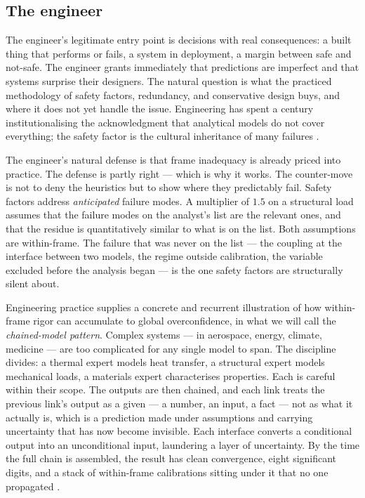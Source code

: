 \documentclass[11pt,a4paper]{article}
\begin{document}
\subsection{The engineer}
\label{sec:engineer}

The engineer's legitimate entry point is decisions with real
consequences: a built thing that performs or fails, a system in
deployment, a margin between safe and not-safe. The engineer grants
immediately that predictions are imperfect and that systems surprise
their designers. The natural question is what the practiced methodology
of safety factors, redundancy, and conservative design buys, and where it
does not yet handle the issue. Engineering has spent a century
institutionalising the acknowledgment that analytical models do not cover
everything; the safety factor is the cultural inheritance of many
failures \citep{Petroski1985,Perrow1984,Vaughan1996}.

The engineer's natural defense is that frame inadequacy is already priced
into practice. The defense is partly right --- which is why it works.
The counter-move is not to deny the heuristics but to show where they
predictably fail. Safety factors address \emph{anticipated} failure modes.
A multiplier of $1.5$ on a structural load assumes that the failure modes
on the analyst's list are the relevant ones, and that the residue is
quantitatively similar to what is on the list. Both assumptions are
within-frame. The failure that was never on the list --- the coupling at
the interface between two models, the regime outside calibration, the
variable excluded before the analysis began --- is the one safety factors
are structurally silent about.

Engineering practice supplies a concrete and recurrent illustration of
how within-frame rigor can accumulate to global overconfidence, in what
we will call the \emph{chained-model pattern}. Complex systems --- in
aerospace, energy, climate, medicine --- are too complicated for any
single model to span. The discipline divides: a thermal expert models
heat transfer, a structural expert models mechanical loads, a materials
expert characterises properties. Each is careful within their scope. The
outputs are then chained, and each link treats the previous link's
output as a given --- a number, an input, a fact --- not as what it
actually is, which is a prediction made under assumptions and carrying
uncertainty that has now become invisible. Each interface converts a
conditional output into an unconditional input, laundering a layer of
uncertainty. By the time the full chain is assembled, the result has
clean convergence, eight significant digits, and a stack of within-frame
calibrations sitting under it that no one propagated
\citep{OberkampfRoy2010,RoyOberkampf2011}.
\end{document}
